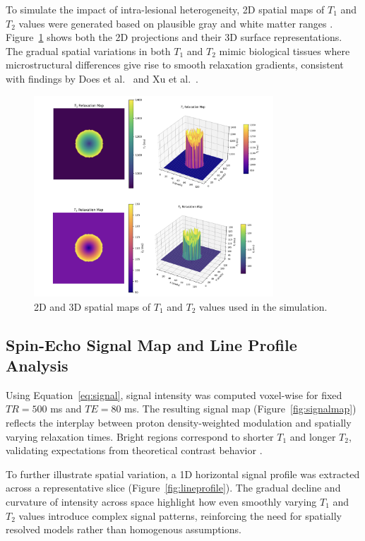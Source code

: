 \documentclass[10pt,a4paper,twoside]{article}
\begin{document}
To simulate the impact of intra-lesional heterogeneity, 2D spatial maps of \( T_1 \) and \( T_2 \) values were generated based on plausible gray and white matter ranges \cite{stanisz2005, bojorquez2017}. Figure~\ref{fig:t1t2maps} shows both the 2D projections and their 3D surface representations. The gradual spatial variations in both \( T_1 \) and \( T_2 \) mimic biological tissues where microstructural differences give rise to smooth relaxation gradients, consistent with findings by Does et al.\ \cite{does2002} and Xu et al.\ \cite{xu2009}.

\begin{figure}[htbp!]
\centering
\includegraphics[width=0.8\textwidth]{t1t2maps.png}
\caption{2D and 3D spatial maps of \( T_1 \) and \( T_2 \) values used in the simulation.}
\label{fig:t1t2maps}
\end{figure}


\subsection{Spin-Echo Signal Map and Line Profile Analysis}

Using Equation~\eqref{eq:signal}, signal intensity was computed voxel-wise for fixed \( TR = 500 \) ms and \( TE = 80 \) ms. The resulting signal map (Figure~\ref{fig:signalmap}) reflects the interplay between proton density-weighted modulation and spatially varying relaxation times. Bright regions correspond to shorter \( T_1 \) and longer \( T_2 \), validating expectations from theoretical contrast behavior \cite{bernstein2004, brown2014}.

To further illustrate spatial variation, a 1D horizontal signal profile was extracted across a representative slice (Figure~\ref{fig:lineprofile}). The gradual decline and curvature of intensity across space highlight how even smoothly varying \( T_1 \) and \( T_2 \) values introduce complex signal patterns, reinforcing the need for spatially resolved models rather than homogenous assumptions.
\end{document}
